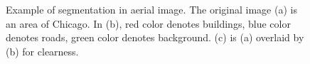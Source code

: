 \begin{figure}[!h]
{	}
    \caption[Example of segmentation in aerial image.]{Example of segmentation in aerial image. The original image (a) is an area of Chicago. In (b), red color denotes buildings, blue color denotes roads, green color denotes background. (c) is (a) overlaid by (b) for clearness.}
	\label{fig:egarlimgseg}
\end{figure}